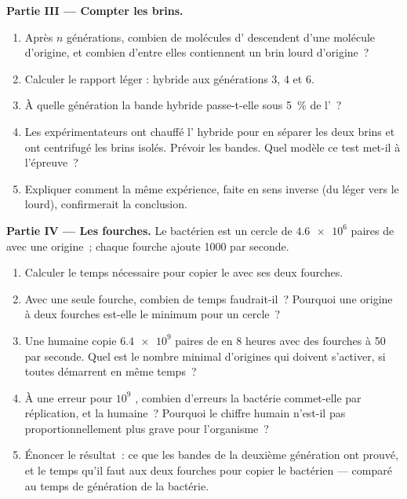 \begin{problem}
\medskip
\noindent\textbf{Partie III --- Compter les brins.}
\begin{enumerate}[resume]
  \item Après $n$ générations, combien de molécules d' descendent
        d'une molécule d'origine, et combien d'entre elles contiennent
        un brin lourd d'origine~?
  \item Calculer le rapport léger : hybride aux générations 3, 4 et 6.
  \item À quelle génération la bande hybride passe-t-elle sous 5~\% de
        l'~?
  \item Les expérimentateurs ont chauffé l' hybride pour en séparer
        les deux brins et ont centrifugé les brins isolés. Prévoir les
        bandes. Quel modèle ce test met-il à l'épreuve~?
  \item Expliquer comment la même expérience, faite en sens inverse
        (du léger vers le lourd), confirmerait la conclusion.
\end{enumerate}

\medskip
\noindent\textbf{Partie IV --- Les fourches.}
Le  bactérien est un cercle de $\num{4.6e6}$ paires de 
avec une origine~; chaque fourche ajoute 1000  par seconde.
\begin{enumerate}[resume]
  \item Calculer le temps nécessaire pour copier le  avec ses
        deux fourches.
  \item Avec une seule fourche, combien de temps faudrait-il~?
        Pourquoi une origine à deux fourches est-elle le minimum pour
        un cercle~?
  \item Une  humaine copie $\num{6.4e9}$ paires de  en 8
        heures avec des fourches à 50  par seconde. Quel est le
        nombre minimal d'origines qui doivent s'activer, si toutes
        démarrent en même temps~?
  \item À une erreur pour $10^9$ , combien d'erreurs la
        bactérie commet-elle par réplication, et la  humaine~?
        Pourquoi le chiffre humain n'est-il pas proportionnellement
        plus grave pour l'organisme~?
  \item Énoncer le résultat~: ce que les bandes de la deuxième
        génération ont prouvé, et le temps qu'il faut aux deux fourches
        pour copier le  bactérien --- comparé au temps de
        génération de la bactérie.
\end{enumerate}
\end{problem}
